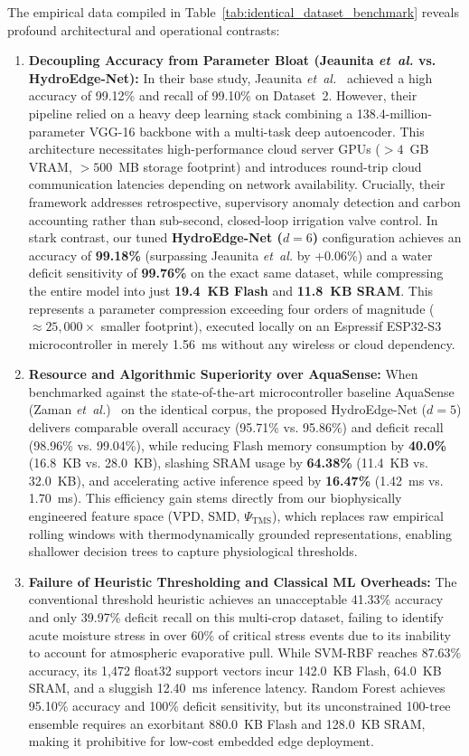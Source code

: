 The empirical data compiled in Table~\ref{tab:identical_dataset_benchmark} reveals profound architectural and operational contrasts:
\begin{enumerate}
    \item \textbf{Decoupling Accuracy from Parameter Bloat (Jeaunita \textit{et~al.} vs. HydroEdge-Net):} In their base study, Jeaunita \textit{et~al.}~\cite{jeaunita2025multitask} achieved a high accuracy of 99.12\% and recall of 99.10\% on Dataset~2. However, their pipeline relied on a heavy deep learning stack combining a 138.4-million-parameter VGG-16 backbone with a multi-task deep autoencoder. This architecture necessitates high-performance cloud server GPUs ($>4$~GB VRAM, $>500$~MB storage footprint) and introduces round-trip cloud communication latencies depending on network availability. Crucially, their framework addresses retrospective, supervisory anomaly detection and carbon accounting rather than sub-second, closed-loop irrigation valve control. In stark contrast, our tuned \textbf{HydroEdge-Net ($d=6$)} configuration achieves an accuracy of \textbf{99.18\%} (surpassing Jeaunita \textit{et~al.} by +0.06\%) and a water deficit sensitivity of \textbf{99.76\%} on the exact same dataset, while compressing the entire model into just \textbf{19.4~KB Flash} and \textbf{11.8~KB SRAM}. This represents a parameter compression exceeding four orders of magnitude ($\approx 25,000\times$ smaller footprint), executed locally on an Espressif ESP32-S3 microcontroller in merely 1.56~ms without any wireless or cloud dependency.
    \item \textbf{Resource and Algorithmic Superiority over AquaSense:} When benchmarked against the state-of-the-art microcontroller baseline AquaSense (Zaman \textit{et~al.})~\cite{zaman2026aquasense} on the identical corpus, the proposed HydroEdge-Net ($d=5$) delivers comparable overall accuracy (95.71\% vs. 95.86\%) and deficit recall (98.96\% vs. 99.04\%), while reducing Flash memory consumption by \textbf{40.0\%} (16.8~KB vs. 28.0~KB), slashing SRAM usage by \textbf{64.38\%} (11.4~KB vs. 32.0~KB), and accelerating active inference speed by \textbf{16.47\%} (1.42~ms vs. 1.70~ms). This efficiency gain stems directly from our biophysically engineered feature space (VPD, SMD, $\Psi_{\text{TMS}}$), which replaces raw empirical rolling windows with thermodynamically grounded representations, enabling shallower decision trees to capture physiological thresholds.
    \item \textbf{Failure of Heuristic Thresholding and Classical ML Overheads:} The conventional threshold heuristic achieves an unacceptable 41.33\% accuracy and only 39.97\% deficit recall on this multi-crop dataset, failing to identify acute moisture stress in over 60\% of critical stress events due to its inability to account for atmospheric evaporative pull. While SVM-RBF reaches 87.63\% accuracy, its 1,472 float32 support vectors incur 142.0~KB Flash, 64.0~KB SRAM, and a sluggish 12.40~ms inference latency. Random Forest achieves 95.10\% accuracy and 100\% deficit sensitivity, but its unconstrained 100-tree ensemble requires an exorbitant 880.0~KB Flash and 128.0~KB SRAM, making it prohibitive for low-cost embedded edge deployment.

\end{enumerate}

